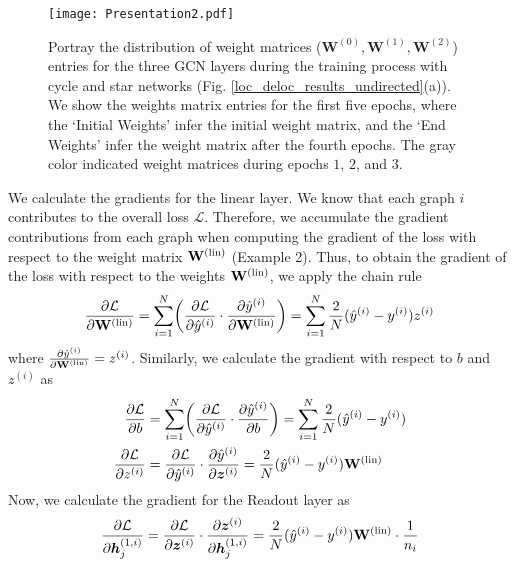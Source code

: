 \documentclass[aps, prd, showpacs, floatfix, superscriptaddress, twocolumn, nofootinbib, preprintnumbers, longbibliography]{revtex4-2}
\begin{document}
\begin{figure*}[tbh]
\begin{center}
\texttt{[image: Presentation2.pdf]}
\caption{Portray the distribution of weight matrices ($\mathbf{W}^{(0)},\mathbf{W}^{(1)},\mathbf{W}^{(2)}$) entries for the three GCN layers during the training process with cycle and star networks (Fig. \ref{loc_deloc_results_undirected}(a)). We show the weights matrix entries for the first five epochs, where the `Initial Weights' infer the initial weight matrix, and the `End Weights' infer the weight matrix after the fourth epochs. The gray color indicated weight matrices during epochs $1$, $2$, and $3$.}
\label{weight_matrices}
\end{center}
\end{figure*}
We calculate the gradients for the linear layer. We know that each graph $i$ contributes to the overall loss $\mathcal{L}$. Therefore, we accumulate the gradient contributions from each graph when computing the gradient of the loss with respect to the weight matrix ${\bf W}^{(\text{lin})}$ (Example 2). Thus, to obtain the gradient of the loss with respect to the weights \({\bf W}^{(\text{lin})}\), we apply the chain rule
\begin{equation}\nonumber 
\frac{\partial \mathcal{L}}{\partial {\bf W}^{(\text{lin})}} = \sum_{i=1}^N \biggl(\frac{\partial \mathcal{L}}{\partial \hat{y}^{(i)}} \cdot \frac{\partial \hat{y}^{(i)}}{\partial {\bf W}^{(\text{lin})}}\biggr) = \sum_{i=1}^N \frac{2}{N} (\hat{y}^{(i)} - y^{(i)}) z^{(i)}    
\end{equation}
where $\frac{\partial \hat{y}^{(i)}}{\partial {\bf W}^{(\text{lin})}} = z^{(i)}$. Similarly, we calculate the gradient with respect to $b$ and $z^{(i)}$ as 
\begin{equation}
\begin{split}
\frac{\partial \mathcal{L}}{\partial b} &= \sum_{i=1}^N \biggl(\frac{\partial \mathcal{L}}{\partial \hat{y}^{(i)}} \cdot \frac{\partial \hat{y}^{(i)}}{\partial b}\biggr) = \sum_{i=1}^N \frac{2}{N} (\hat{y}^{(i)} - y^{(i)}) \\
\frac{\partial \mathcal{L}}{\partial z^{(i)}} &= \frac{\partial \mathcal{L}}{\partial \hat{y}^{(i)}} \cdot \frac{\partial \hat{y}^{(i)}}{\partial \bm{z}^{(i)}} = \frac{2}{N} (\hat{y}^{(i)} - y^{(i)}) {\bf W}^{(\text{lin})}
\end{split}
\end{equation}
Now, we calculate the gradient for the Readout layer as
\begin{equation}\label{ap_f1}
\frac{\partial \mathcal{L}}{\partial \bm{h}^{(1,i)}_j} = \frac{\partial \mathcal{L}}{\partial \bm{z}^{(i)}} \cdot \frac{\partial \bm{z}^{(i)}}{\partial \bm{h}^{(1,i)}_j} = \frac{2}{N} (\hat{y}^{(i)} - y^{(i)}) {\bf W}^{(\text{lin})}\cdot \frac{1}{n_i}
\end{equation}
\end{document}
